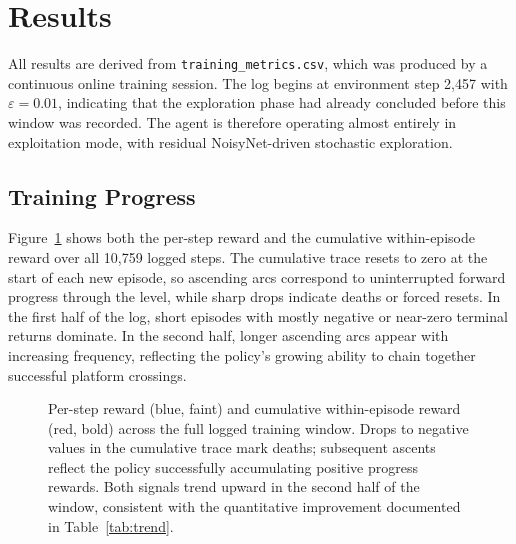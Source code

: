 \documentclass[11pt]{article}
\begin{document}
\section{Results}
\label{sec:results}

All results are derived from \texttt{training\_metrics.csv}, which was
produced by a continuous online training session. The log begins at
environment step 2{,}457 with $\varepsilon = 0.01$, indicating that the
exploration phase had already concluded before this window was recorded.
The agent is therefore operating almost entirely in exploitation mode,
with residual NoisyNet-driven stochastic exploration.

\subsection{Training Progress}

Figure~\ref{fig:reward_step} shows both the per-step reward and the
cumulative within-episode reward over all 10{,}759 logged steps. The
cumulative trace resets to zero at the start of each new episode, so
ascending arcs correspond to uninterrupted forward progress through the
level, while sharp drops indicate deaths or forced resets. In the first
half of the log, short episodes with mostly negative or near-zero
terminal returns dominate. In the second half, longer ascending arcs
appear with increasing frequency, reflecting the policy's growing ability
to chain together successful platform crossings.

\begin{figure}[htbp]
  \centering
  \caption{Per-step reward (blue, faint) and cumulative within-episode
    reward (red, bold) across the full logged training window. Drops to
    negative values in the cumulative trace mark deaths; subsequent
    ascents reflect the policy successfully accumulating positive
    progress rewards. Both signals trend upward in the second half of
    the window, consistent with the quantitative improvement documented
    in Table~\ref{tab:trend}.}
  \label{fig:reward_step}
\end{figure}
\end{document}
